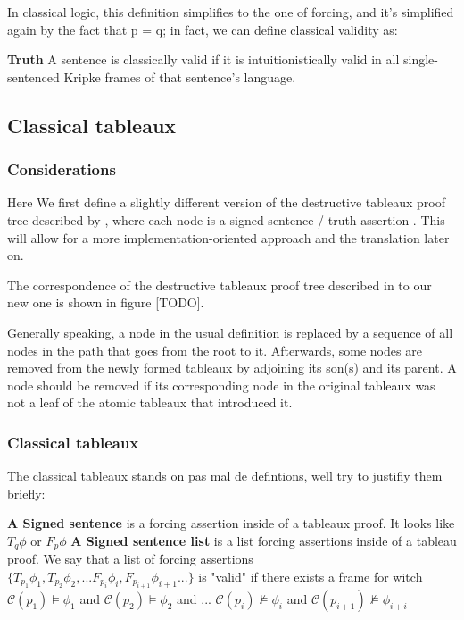 \documentclass[runningheads]{llncs}
\begin{document}
In classical logic, this definition simplifies to the one of forcing, and it's simplified again by the fact that p = q; in fact, we can define classical validity as: \cite{book1}

\begin{definition}
    \textbf{Truth}
    A sentence is classically valid if it is intuitionistically valid in all single-sentenced Kripke frames of that sentence's language. 
\end{definition}

\subsection{Classical tableaux}

\subsubsection{Considerations}
    Here We first define a slightly different version of the destructive tableaux proof tree described by \cite{book1}, where each node is a signed sentence  / truth assertion . This will allow for a more implementation-oriented approach and the translation later on. 
    
    The correspondence of the destructive tableaux proof tree described in \cite{book1} to our new one is shown in figure [TODO].
    
    Generally speaking,
    a node in the usual definition is replaced by a sequence of 
    all nodes in the path that goes from the root to it. Afterwards, some nodes are removed from the newly formed tableaux by adjoining its son(s) and its parent. A node should be removed if its corresponding node in the original tableaux was not a leaf of the atomic tableaux that introduced it.   
    


\subsubsection{Classical tableaux}
The classical tableaux stands on pas mal de defintions, well try to justifiy them briefly:
\begin{definition}
    \textbf{A Signed sentence} is a forcing assertion inside of a tableaux proof. It looks like $T_{q} \phi $ or $F_{p} \phi $ 
    \textbf{A Signed sentence list} is a list forcing assertions inside of a tableau proof. We say that a list of forcing assertions \\$\{ T_{p_1}\phi_{1}, T_{p_2}\phi_{2}, ... F_{p_i}\phi_{i}, F_{p_{i+1}}\phi_{i+1}...\} $
     is "valid" if there exists a frame for witch $ \mathcal{C}(p_1) \vDash \phi_{1}$ and $ \mathcal{C}(p_{2}) \vDash \phi_{2}$ and ... $ \mathcal{C}(p_{i}) \nvDash \phi_{i}$  and $ \mathcal{C}(p_{i+1}) \nvDash \phi_{i+i}$
\end{definition}
 
\end{document}
